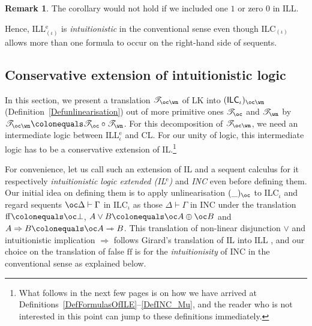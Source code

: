 \documentclass[a4paper]{article}
\theoremstyle{definition}
\newtheorem{remark}[definition]{Remark}
\theoremstyle{theorem}
\theoremstyle{remark}
\begin{document}
\begin{remark}
The corollary would not hold if we included one $1$ or zero $0$ in ILL.
\end{remark}
\fi

Hence, ILL$^{\text{e}}_{(\iota)}$ is \emph{intuitionistic} in the conventional sense even though \textsf{ILC$_{(\iota)}$} allows more than one formula to occur on the right-hand side of sequents.











\subsection{Conservative extension of intuitionistic logic}
\label{ConservativeExtensionOfIntuitionisticLogic}
In this section, we present a translation $\mathscr{T}_{\oc\wn}$ of \textsf{LK} into $(\textsf{ILC$_\iota$})_{\oc\wn}$ (Definition~\ref{Defunlinearisation}) out of more primitive ones $\mathscr{T}_{\oc}$ and $\mathscr{T}_{\wn}$ by $\mathscr{T}_{\oc\wn} \colonequals \mathscr{T}_{\oc} \circ \mathscr{T}_{\wn}$.
For this decomposition of $\mathscr{T}_{\oc\wn}$, we need an intermediate logic between ILL$^{\text{e}}_\iota$ and CL.
For our unity of logic, this intermediate logic has to be a conservative extension of IL.\footnote{What follows in the next few pages is on how we have arrived at Definitions~\ref{DefFormulasOfILE}--\ref{DefINC_Mu}, and the reader who is not interested in this point can jump to these definitions immediately.}

For convenience, let us call such an extension of IL and a sequent calculus for it respectively \emph{intuitionistic logic extended (IL$^{\text{e}}$)} and \emph{\textsf{INC}} even before defining them.
Our initial idea on defining them is to apply unlinearisation $(\_)_\oc$ to \textsf{ILC$_\iota$} and regard sequents $\oc \Delta \vdash \Gamma$ in \textsf{ILC$_\iota$} as those $\Delta \vdash \Gamma$ in \textsf{INC} under the translation $\mathrm{ff} \colonequals \oc \bot$, $A \vee B \colonequals \oc A \oplus \oc B$ and $A \Rightarrow B \colonequals \oc A \rightarrowtriangle B$.
This translation of non-linear disjunction $\vee$ and intuitionistic implication $\Rightarrow$ follows Girard's translation of IL into ILL \cite[\S 5.1]{girard1987linear}, and our choice on the translation of false $\mathrm{ff}$ is for the \emph{intuitionisity} of \textsf{INC} in the conventional sense as explained below.
\end{document}
